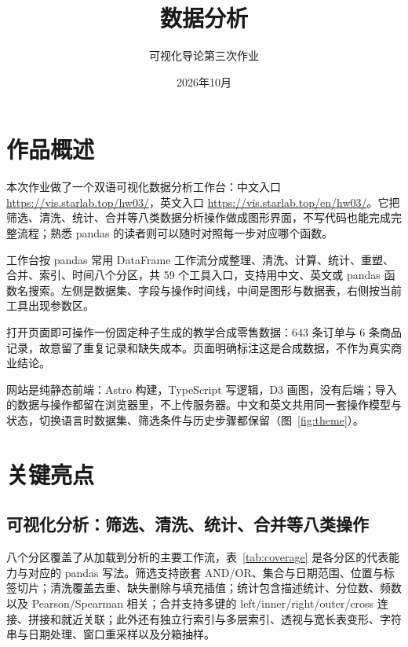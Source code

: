 \documentclass[UTF8,a4paper,11pt,fontset=fandol]{ctexart}
\title{数据分析}
\author{可视化导论第三次作业}
\date{2026年10月}
\begin{document}
\maketitle

\section{作品概述}

本次作业做了一个双语可视化数据分析工作台：中文入口 \url{https://vis.starlab.top/hw03/}，英文入口 \url{https://vis.starlab.top/en/hw03/}。它把筛选、清洗、统计、合并等八类数据分析操作做成图形界面，不写代码也能完成完整流程；熟悉 pandas 的读者则可以随时对照每一步对应哪个函数。

工作台按 pandas 常用 DataFrame 工作流分成整理、清洗、计算、统计、重塑、合并、索引、时间八个分区，共 59 个工具入口，支持用中文、英文或 pandas 函数名搜索。左侧是数据集、字段与操作时间线，中间是图形与数据表，右侧按当前工具出现参数区。

打开页面即可操作一份固定种子生成的教学合成零售数据：643 条订单与 6 条商品记录，故意留了重复记录和缺失成本。页面明确标注这是合成数据，不作为真实商业结论。

网站是纯静态前端：Astro 构建，TypeScript 写逻辑，D3 画图，没有后端；导入的数据与操作都留在浏览器里，不上传服务器。中文和英文共用同一套操作模型与状态，切换语言时数据集、筛选条件与历史步骤都保留（图~\ref{fig:theme}）。

\section{关键亮点}

\subsection{可视化分析：筛选、清洗、统计、合并等八类操作}

八个分区覆盖了从加载到分析的主要工作流，表~\ref{tab:coverage} 是各分区的代表能力与对应的 pandas 写法。筛选支持嵌套 AND/OR、集合与日期范围、位置与标签切片；清洗覆盖去重、缺失删除与填充插值；统计包含描述统计、分位数、频数以及 Pearson/Spearman 相关；合并支持多键的 left/inner/right/outer/cross 连接、拼接和就近关联；此外还有独立行索引与多层索引、透视与宽长表变形、字符串与日期处理、窗口重采样以及分箱抽样。
\end{document}
